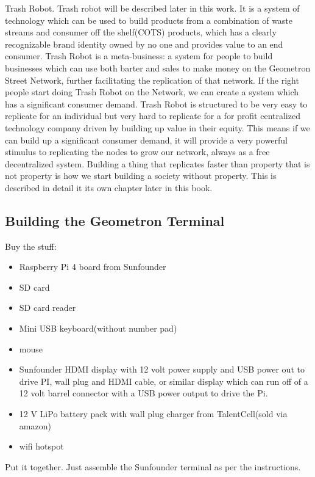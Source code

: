 Trash Robot.  Trash robot will be described later in this work.  It is a system of technology which can be used to build products from a combination of waste streams and consumer off the shelf(COTS) products, which has a clearly recognizable brand identity owned by no one and provides value to an end consumer.  Trash Robot is a meta-business: a system for people to build businesses which can use both barter and sales to make money on the Geometron Street Network, further facilitating the replication of that network. If the right people start doing Trash Robot on the Network, we can create a system which has a significant consumer demand.  Trash Robot is structured to be very easy to replicate for an individual but very hard to replicate for a for profit centralized technology company driven by building up value in their equity.  This means if we can build up a significant consumer demand, it will provide a very powerful stimulus to replicating the nodes to grow our network, always as a free decentralized system.  Building a thing that replicates faster than property that is not property is how we start building a society without property.  This is described in detail it its own chapter later in this book.

\subsection{Building the Geometron Terminal}

Buy the stuff:

\begin{itemize}
\item
Raspberry Pi 4 board from Sunfounder
\item
SD card
\item
SD card reader
\item
Mini USB keyboard(without number pad)
\item
mouse
\item
Sunfounder HDMI display with 12 volt power supply and USB power out to drive PI, wall plug and HDMI cable, or similar display which can run off of a 12 volt barrel connector with a USB power output to drive the Pi.
\item
12 V LiPo battery pack with wall plug charger from TalentCell(sold via amazon)
\item
wifi hotspot
\end{itemize}

Put it together.  Just assemble the Sunfounder terminal as per the instructions.  

